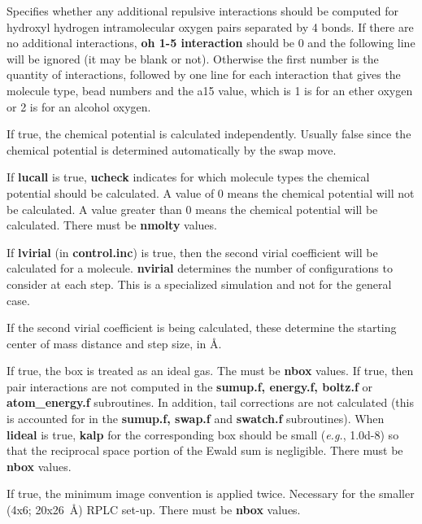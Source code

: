 \documentclass[12pt,letterpaper]{article}
\begin{document}
{{{{{{ Specifies whether any additional
repulsive interactions should be computed for hydroxyl hydrogen
intramolecular oxygen pairs separated by 4 bonds.  
If there are no additional interactions, {\textbf {oh 1-5 interaction}} should be 0 and the
following line will be ignored (it may be blank or not).
Otherwise the first number is the quantity of interactions, followed by one line for
each interaction that gives the molecule type, bead numbers and the a15 value,
which is 1 is for an ether oxygen or 2 is for an alcohol oxygen.

 If true, the chemical potential is calculated independently.
Usually false since the chemical potential is determined automatically by the swap move.

 If {\textbf {lucall}} is true, {\textbf{ucheck}} indicates for which 
molecule types the chemical potential should be calculated.  A value of 0 means the chemical potential
will not be calculated.  A value greater than 0 means the chemical potential will be calculated.
There must be {\textbf{nmolty}} values.

 If {\textbf {lvirial}} (in {\textbf{control.inc}}) is true,
then the second virial coefficient will be calculated for a molecule.
{\textbf {nvirial}} determines the number of configurations to consider
at each step.  This is a specialized simulation and not for the
general case.

 If the second virial coefficient is being
calculated, these determine the starting center of mass distance and
step size, in {\AA}.

 If true, the box is treated as an ideal gas.  
The must be {\textbf{nbox}} values.  If true, then pair interactions are not computed
in the {\bf sumup.f, energy.f, boltz.f} or {\bf atom\_energy.f} subroutines.  In addition, tail corrections
are not calculated (this is accounted for in the {\bf sumup.f, swap.f} and {\bf swatch.f} subroutines).
When {\bf lideal} is true, {\bf kalp} for the corresponding box should be small ({\it e.g.}, 1.0d-8) so that
the reciprocal space portion of the Ewald sum is negligible.  There must be {\bf nbox} values.

 If true, the minimum image convention
is applied twice.  Necessary for the smaller (4x6; 20x26~{\AA})
RPLC set-up.  There must be {\textbf{nbox}} values.   

}}}}}}
\end{document}
